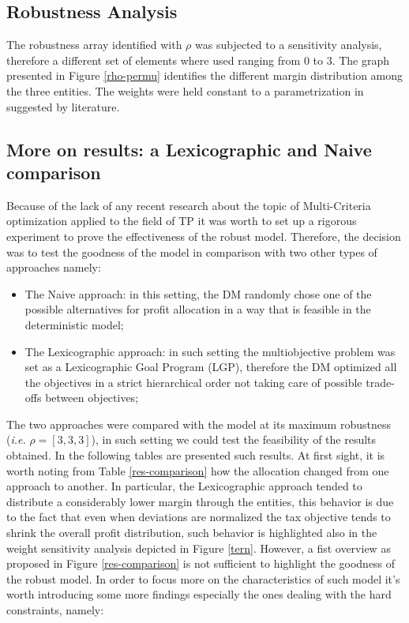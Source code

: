 \documentclass[conference,final,]{IEEEtran}
\begin{document}
\hypertarget{robust-sense}{%
\subsection{Robustness Analysis}\label{robust-sense}}
The robustness array identified with \(\rho\) was subjected to a sensitivity analysis, therefore a different set of elements where used ranging from \(0\) to \(3\). The graph presented in Figure \ref{rho-permu} identifies the different margin distribution among the three entities. The weights were held constant to a parametrization in suggested by literature.
 
\hypertarget{more-result}{%
  \subsection{More on results: a Lexicographic and Naive comparison}\label{conclusion}}
Because of the lack of any recent research\cite{merville1978} about the topic of Multi-Criteria optimization applied to the field of TP it was worth to set up a rigorous experiment to prove the effectiveness of the robust model. Therefore, the decision was to test the goodness of the model in comparison with two other types of approaches namely:
\begin{itemize}
\item The Naive approach: in this setting, the DM randomly chose one of the possible alternatives for profit allocation in a way that is feasible in the deterministic model;
\item The Lexicographic approach: in such setting the multiobjective problem was set as a Lexicographic Goal Program (LGP), therefore the DM optimized all the objectives in a strict hierarchical order not taking care of possible trade-offs between objectives;
\end{itemize}
The two approaches were compared with the model at its maximum robustness (\emph{i.e.} $\rho=[3,3,3]$), in such setting we could test the feasibility of the results obtained. In the following tables are presented such results. At first sight, it is worth noting from Table \ref{res-comparison} how the allocation changed from one approach to another. In particular, the Lexicographic approach tended to distribute a considerably lower margin through the entities, this behavior is due to the fact that even when deviations are normalized the tax objective tends to shrink the overall profit distribution, such behavior is highlighted also in the weight sensitivity analysis depicted in Figure \ref{tern}. However, a fist overview as proposed in Figure \ref{res-comparison} is not sufficient to highlight the goodness of the robust model. In order to focus more on the characteristics of such model it's worth introducing some more findings especially the ones dealing with the hard constraints, namely:
\end{document}
